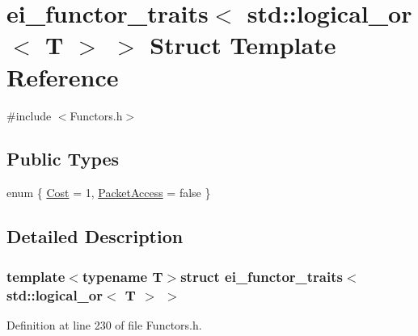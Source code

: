 \hypertarget{structei__functor__traits_3_01std_1_1logical__or_3_01_t_01_4_01_4}{\section{ei\-\_\-functor\-\_\-traits$<$ std\-:\-:logical\-\_\-or$<$ T $>$ $>$ Struct Template Reference}
\label{structei__functor__traits_3_01std_1_1logical__or_3_01_t_01_4_01_4}
}


{\ttfamily \#include $<$Functors.\-h$>$}

\subsection*{Public Types}
\begin{DoxyCompactItemize}
\item 
enum \{ \hyperlink{structei__functor__traits_3_01std_1_1logical__or_3_01_t_01_4_01_4_a5f903fcff8aa767f5e06cc457d210581adf6f98e87b4bda2f94887f57cb26c334}{Cost} = 1, 
\hyperlink{structei__functor__traits_3_01std_1_1logical__or_3_01_t_01_4_01_4_a5f903fcff8aa767f5e06cc457d210581a5a9b18dbee0404b3e044b99000e0fa99}{Packet\-Access} = false
 \}
\end{DoxyCompactItemize}


\subsection{Detailed Description}
\subsubsection*{template$<$typename T$>$struct ei\-\_\-functor\-\_\-traits$<$ std\-::logical\-\_\-or$<$ T $>$ $>$}



Definition at line 230 of file Functors.\-h.



